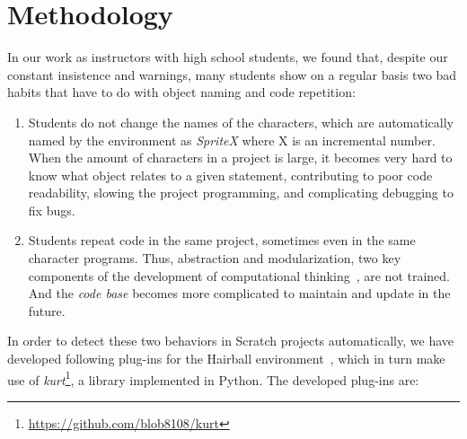 \documentclass[conference]{format/IEEEtran}
\begin{document}
\section{Methodology}
\label{sec:methodology}

In our work as instructors with high school students, we found that, despite our constant insistence and warnings, many students show on a regular basis two bad habits that have to do with object naming and code repetition:

\begin{enumerate}

  \item Students do not change the names of the characters, which are automatically named by the environment as \textit{SpriteX} where X is an incremental number. When the amount of characters in a project is large, it becomes very hard to know what object relates to a given statement, contributing to poor code readability, slowing the project programming, and complicating debugging to fix bugs.

  \item Students repeat code in the same project, sometimes even in the same character programs. Thus, abstraction and modularization, two key components of the development of computational thinking~\cite{wing2008computational}, are not trained. And the \emph{code base} becomes more complicated to maintain and update in the future.

\end{enumerate}

In order to detect these two behaviors in Scratch projects automatically, we have developed following plug-ins for the Hairball environment~\cite{boe2013hairball}, which in turn make use of \textit{kurt}\footnote{\url{https://github.com/blob8108/kurt}}, a library implemented in Python. The developed plug-ins are:
\end{document}
